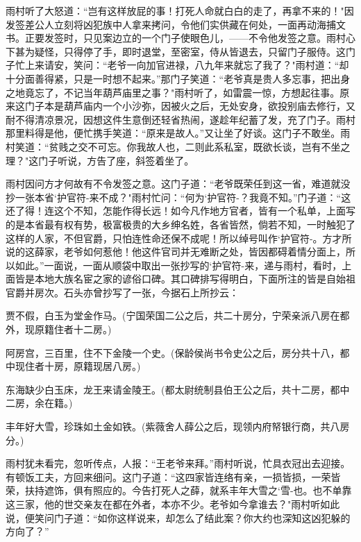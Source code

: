 雨村听了大怒道：“岂有这样放屁的事！打死人命就白白的走了，再拿不来的！"因发签差公人立刻将凶犯族中人拿来拷问，令他们实供藏在何处，一面再动海捕文书。正要发签时，只见案边立的一个门子使眼色儿，——不令他发签之意。雨村心下甚为疑怪，只得停了手，即时退堂，至密室，侍从皆退去，只留门子服侍。这门子忙上来请安，笑问：“老爷一向加官进禄，八九年来就忘了我了？"雨村道：“却十分面善得紧，只是一时想不起来。”那门子笑道：“老爷真是贵人多忘事，把出身之地竟忘了，不记当年葫芦庙里之事？"雨村听了，如雷震一惊，方想起往事。原来这门子本是葫芦庙内一个小沙弥，因被火之后，无处安身，欲投别庙去修行，又耐不得清凉景况，因想这件生意倒还轻省热闹，遂趁年纪蓄了发，充了门子。雨村那里料得是他，便忙携手笑道：“原来是故人。”又让坐了好谈。这门子不敢坐。雨村笑道：“贫贱之交不可忘。你我故人也，二则此系私室，既欲长谈，岂有不坐之理？"这门子听说，方告了座，斜签着坐了。

雨村因问方才何故有不令发签之意。这门子道：“老爷既荣任到这一省，难道就没抄一张本省`护官符-来不成？"雨村忙问：“何为`护官符-？我竟不知。”门子道：“这还了得！连这个不知，怎能作得长远！如今凡作地方官者，皆有一个私单，上面写的是本省最有权有势，极富极贵的大乡绅名姓，各省皆然，倘若不知，一时触犯了这样的人家，不但官爵，只怕连性命还保不成呢！所以绰号叫作`护官符-。方才所说的这薛家，老爷如何惹他！他这件官司并无难断之处，皆因都碍着情分面上，所以如此。”一面说，一面从顺袋中取出一张抄写的`护官符-来，递与雨村，看时，上面皆是本地大族名宦之家的谚俗口碑。其口碑排写得明白，下面所注的皆是自始祖官爵并房次。石头亦曾抄写了一张，今据石上所抄云：

贾不假，白玉为堂金作马。(宁国荣国二公之后，共二十房分，宁荣亲派八房在都外，现原籍住者十二房。)

阿房宫，三百里，住不下金陵一个史。(保龄侯尚书令史公之后，房分共十八，都中现住者十房，原籍现居八房。)

东海缺少白玉床，龙王来请金陵王。(都太尉统制县伯王公之后，共十二房，都中二房，余在籍。)

丰年好大雪，珍珠如土金如铁。(紫薇舍人薛公之后，现领内府帑银行商，共八房分。)

雨村犹未看完，忽听传点，人报：“王老爷来拜。”雨村听说，忙具衣冠出去迎接。有顿饭工夫，方回来细问。这门子道：“这四家皆连络有亲，一损皆损，一荣皆荣，扶持遮饰，俱有照应的。今告打死人之薛，就系丰年大雪之`雪-也。也不单靠这三家，他的世交亲友在都在外者，本亦不少。老爷如今拿谁去？"雨村听如此说，便笑问门子道：“如你这样说来，却怎么了结此案？你大约也深知这凶犯躲的方向了？”


